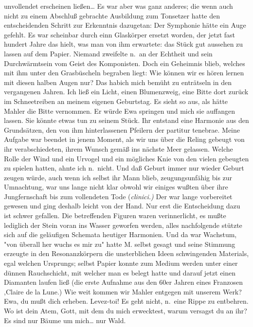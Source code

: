 \documentclass[
]{article}
\begin{document}
unvollendet erscheinen ließen\ldots{} Es war aber was ganz anderes; die
wenn auch nicht zu einem Abschluß gebrachte Ausbildung zum Tonsetzer
hatte den entscheidenden Schritt zur Erkenntnis dazugetan: Der Symphonie
hätte ein Auge gefehlt. Es war scheinbar durch einn Glaskörper ersetzt
worden, der jetzt fast hundert Jahre das hielt, was man von ihm
erwartete: das Stück gut aussehen zu lassen auf dem Papier. Niemand
zweifelte n.~an der Echtheit und sein Durchwärmtsein vom Geist des
Komponisten. Doch ein Geheimnis blieb, welches mit ihm unter den
Grasbüscheln begraben liegt: Wie können wir es hören lernen mit diesen
halben Augen nur? Das habich mich bemüht zu enträtseln in den
vergangenen Jahren. Ich ließ ein Licht, einen Blumenzweig, eine Bitte
dort zurück im Schneetreiben an meinem eigenen Geburtstag. Es sieht so
aus, als hätte Mahler die Bitte vernommen. Er würde Ewa springen und
mich sie auffangen lassen. Sie könnte etwas tun zu seinem Stück. Ihr
entstand eine Harmonie aus den Grundsätzen, den von ihm hinterlassenen
Pfeilern der partitur tenebrae. Meine Aufgabe war beendet in jenem
Moment, als wir uns über die Reling gebeugt von ihr verabschiedeten,
ihrem Wunsch gemäß ins nächste Meer gelassen. Welche Rolle der Wind und
ein Urvogel und ein mögliches Knie von den vielen gebeugten zu spielen
hatten, ahnte ich n.~nicht. Und daß Geburt immer nur wieder Geburt
zeugen würde, auch wenn ich selbst ihr Mann blieb, zeugungsunfähig bis
zur Umnachtung, war uns lange nicht klar obwohl wir einiges wußten über
ihre Jungfernschaft bis zum vollendeten Tode (\emph{clinici.)} Der war
lange vorbereitet gewesen und ging deshalb leicht von der Hand. Nur erst
die Entscheidung dazu ist schwer gefallen. Die betreffenden Figuren
waren verinnerlicht, es mußte lediglich der Stein voran ins Wasser
geworfen werden, alles nachfolgende stützte sich auf die geläufigen
Schemata heutiger Harmonien. Und da war Wachstum, "von überall her wuchs
es mir zu" hatte M. selbst gesagt und seine Stimmung erzeugte in den
Resonanzkörpern die unsterblichen Ideen schwingenden Materials, egal
welchen Ursprungs; selbst Papier konnte zum Medium werden unter einer
dünnen Rauchschicht, mit welcher man es belegt hatte und darauf jetzt
einen Diamanten laufen ließ (die erste Aufnahme aus den 60er Jahren
eines Franzosen ,Claire de la Lune\textquotesingle.) Wie weit kommen wir
Mahler entgegen mit unserem Werk? Ewa, du mußt dich erheben. Levez-toi!
Es geht nicht, n.~eine Rippe zu entbehren. Wo ist dein Atem, Gott, mit
dem du mich erwecktest, warum versagst du an ihr? Es sind nur Bäume um
mich\ldots{} nur Wald.\\
\end{document}

